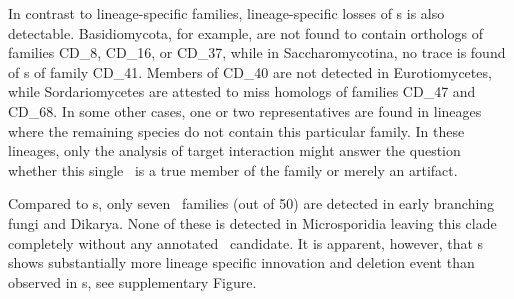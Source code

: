In contrast to lineage-specific families, lineage-specific losses of
\sno s is also detectable. Basidiomycota, for example, are not found
to contain orthologs of families CD\_8, CD\_16, or CD\_37, while in
Saccharomycotina, no trace is found of \sno s of family
CD\_41. Members of CD\_40 are not detected in Eurotiomycetes, while
Sordariomycetes are attested to miss homologs of families CD\_47 and
CD\_68. In some other cases, one or two representatives
are found in lineages where the remaining species do not contain this
particular family. In these lineages, only the analysis of target
interaction might answer the question whether this single \sno\ is
a true member of the family or merely an artifact.


%

Compared to \cd s, only seven \haca\ families (out of 50) are detected in early branching fungi
and Dikarya. None of these is detected in Microsporidia
leaving this clade completely without any annotated \sno\ candidate. It
is apparent, however, that \haca s shows substantially
more lineage specific innovation and deletion event than observed in \cd s, see supplementary Figure.

